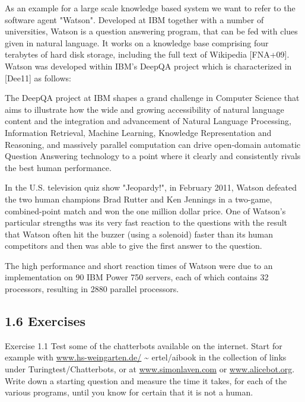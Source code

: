 \documentclass[10pt]{article}
\begin{document}
As an example for a large scale knowledge based system we want to refer to the software agent "Watson". Developed at IBM together with a number of universities, Watson is a question answering program, that can be fed with clues given in natural language. It works on a knowledge base comprising four terabytes of hard disk storage, including the full text of Wikipedia [FNA+09]. Watson was developed within IBM's DeepQA project which is characterized in [Dee11] as follows:

\begin{displayquote}
The DeepQA project at IBM shapes a grand challenge in Computer Science that aims to illustrate how the wide and growing accessibility of natural language content and the integration and advancement of Natural Language Processing, Information Retrieval, Machine Learning, Knowledge Representation and Reasoning, and massively parallel computation can drive open-domain automatic Question Answering technology to a point where it clearly and consistently rivals the best human performance.
\end{displayquote}

In the U.S. television quiz show "Jeopardy!", in February 2011, Watson defeated the two human champions Brad Rutter and Ken Jennings in a two-game, combined-point match and won the one million dollar price. One of Watson's particular strengths was its very fast reaction to the questions with the result that Watson often hit the buzzer (using a solenoid) faster than its human competitors and then was able to give the first answer to the question.

The high performance and short reaction times of Watson were due to an implementation on 90 IBM Power 750 servers, each of which contains 32 processors, resulting in 2880 parallel processors.

\subsection*{1.6 Exercises}
Exercise 1.1 Test some of the chatterbots available on the internet. Start for example with \href{http://www.hs-weingarten.de/}{www.hs-weingarten.de/} \~{} ertel/aibook in the collection of links under Turingtest/Chatterbots, or at \href{http://www.simonlaven.com}{www.simonlaven.com} or \href{http://www.alicebot
.org}{www.alicebot.org}. Write down a starting question and measure the time it takes, for each of the various programs, until you know for certain that it is not a human.
\end{document}
